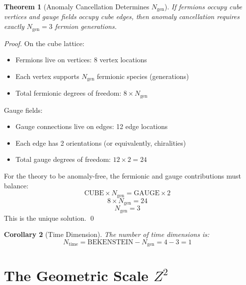 \documentclass[twocolumn,showpacs,preprintnumbers,amsmath,amssymb,prd]{revtex4-2}
\newtheorem{theorem}{Theorem}[section]
\newtheorem{corollary}[theorem]{Corollary}
\begin{document}
\begin{theorem}[Anomaly Cancellation Determines $N_{\text{gen}}$]
\label{thm:anomaly}
If fermions occupy cube vertices and gauge fields occupy cube edges, then anomaly cancellation requires exactly $N_{\text{gen}} = 3$ fermion generations.
\end{theorem}

\begin{proof}
On the cube lattice:
\begin{itemize}
\item Fermions live on vertices: 8 vertex locations
\item Each vertex supports $N_{\text{gen}}$ fermionic species (generations)
\item Total fermionic degrees of freedom: $8 \times N_{\text{gen}}$
\end{itemize}

Gauge fields:
\begin{itemize}
\item Gauge connections live on edges: 12 edge locations
\item Each edge has 2 orientations (or equivalently, chiralities)
\item Total gauge degrees of freedom: $12 \times 2 = 24$
\end{itemize}

For the theory to be anomaly-free, the fermionic and gauge contributions must balance:
\begin{equation}
\text{CUBE} \times N_{\text{gen}} = \text{GAUGE} \times 2
\end{equation}
\begin{equation}
8 \times N_{\text{gen}} = 24
\end{equation}
\begin{equation}
\boxed{N_{\text{gen}} = 3}
\end{equation}
This is the unique solution. \qed
\end{proof}

\begin{corollary}[Time Dimension]
The number of time dimensions is:
\begin{equation}
N_{\text{time}} = \text{BEKENSTEIN} - N_{\text{gen}} = 4 - 3 = 1
\end{equation}
\end{corollary}

\section{The Geometric Scale $Z^2$}
\end{document}
